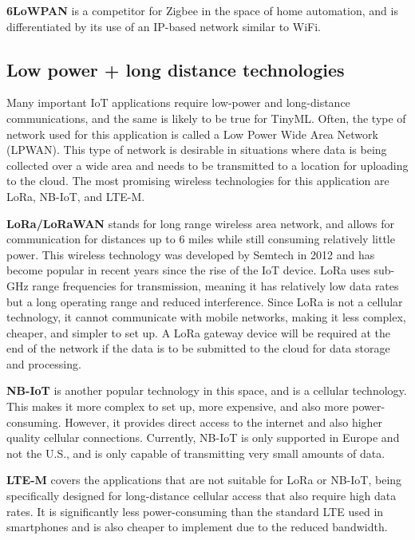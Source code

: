 {{{{{{{{{    \textbf{6LoWPAN} is a competitor for Zigbee in the space of home automation, and is differentiated by its use of an IP-based network similar to WiFi.
    
    \subsection{Low power + long distance technologies}
    
    Many important IoT applications require low-power and long-distance communications, and the same is likely to be true for TinyML. Often, the type of network used for this application is called a Low Power Wide Area Network (LPWAN). This type of network is desirable in situations where data is being collected over a wide area and needs to be transmitted to a location for uploading to the cloud. The most promising wireless technologies for this application are LoRa, NB-IoT, and LTE-M.
    
    \textbf{LoRa/LoRaWAN} stands for long range wireless area network, and allows for communication for distances up to 6 miles while still consuming relatively little power. This wireless technology was developed by Semtech in 2012 and has become popular in recent years since the rise of the IoT device. LoRa uses sub-GHz range frequencies for transmission, meaning it has relatively low data rates but a long operating range and reduced interference. Since LoRa is not a cellular technology, it cannot communicate with mobile networks, making it less complex, cheaper, and simpler to set up. A LoRa gateway device will be required at the end of the network if the data is to be submitted to the cloud for data storage and processing.
    
    \textbf{NB-IoT} is another popular technology in this space, and is a cellular technology. This makes it more complex to set up, more expensive, and also more power-consuming. However, it provides direct access to the internet and also higher quality cellular connections. Currently, NB-IoT is only supported in Europe and not the U.S., and is only capable of transmitting very small amounts of data.
    
    \textbf{LTE-M} covers the applications that are not suitable for LoRa or NB-IoT, being specifically designed for long-distance cellular access that also require high data rates. It is significantly less power-consuming than the standard LTE used in smartphones and is also cheaper to implement due to the reduced bandwidth.
    
}}}}}}}}}
